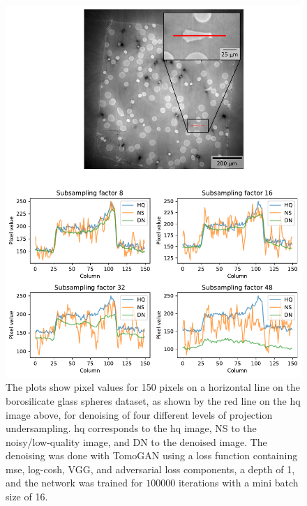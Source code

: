 \begin{figure}[htbp]
  \centering
  \includegraphics[width=.95\textwidth]{figures/differentnoiselineplot1.pdf}
  \caption[Pixel value plot of denoising of different levels of projection undersampling on the borosilicate glass spheres dataset]{The plots show pixel values for 150 pixels on a horizontal line on the borosilicate glass spheres dataset, as shown by the red line on the \gls{hq} image above, for denoising of four different levels of projection undersampling. \gls{hq} corresponds to the \gls{hq} image, NS to the noisy/low-quality image, and DN to the denoised image. The denoising was done with TomoGAN using a loss function containing \gls{mse}, log-cosh, VGG, and adversarial loss components, a depth of 1, and the network was trained for $100 000$ iterations with a mini batch size of 16. }
  \label{fig:differentnoiselineplot1}
\end{figure}

